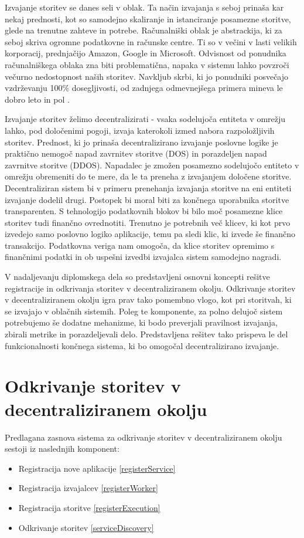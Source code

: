 \documentclass[a4paper, 12pt]{book}
\begin{document}
Izvajanje storitev se danes seli v oblak.
Ta način izvajanja s seboj prinaša kar nekaj prednosti, kot so samodejno skaliranje in istanciranje posamezne storitve, glede na trenutne zahteve in potrebe.
Računalniški oblak je abstrackija, ki za seboj skriva ogromne podatkovne in računske centre.
Ti so v večini v lasti velikih korporacij, prednjačijo Amazon, Google in Microsoft.
Odvisnost od ponudnika računalniškega oblaka zna biti problematična, napaka v sistemu lahko povzroči večurno nedostopnost naših storitev. 
Navkljub skrbi, ki jo ponudniki posvečajo vzdrževanju 100\% dosegljivosti, od zadnjega odmevnejšega primera mineva le dobro leto in pol \cite{awsFail}.

Izvajanje storitev želimo decentralizirati - vsaka sodelujoča entiteta v omrežju lahko, pod določenimi pogoji, izvaja katerokoli izmed nabora razpoložljivih storitev.
Prednost, ki jo prinaša decentralizirano izvajanje poslovne logike je praktično nemogoč napad zavrnitev storitve (DOS) in porazdeljen napad zavrnitve storitve (DDOS).
Napadalec je zmožen posamezno sodelujočo entiteto v omrežju obremeniti do te mere, da le ta preneha z izvajanjem določene storitve.
Decentraliziran sistem bi v primeru prenehanja izvajanja storitve na eni entiteti izvajanje dodelil drugi. Postopek bi moral biti za končnega uporabnika storitve transparenten.
S tehnologijo podatkovnih blokov bi bilo moč posamezne klice storitev tudi finančno ovrednotiti.
Trenutno je potrebnih več klicev, ki kot prvo izvedejo samo poslovno logiko aplikacije, temu pa sledi klic, ki izvede še finančno transakcijo.
Podatkovna veriga nam omogoča, da klice storitev opremimo s finančnimi podatki in ob uspešni izvedbi izvajalca sistem samodejno nagradi.

V nadaljevanju diplomskega dela so predstavljeni osnovni koncepti rešitve registracije in odkrivanja storitev v decentraliziranem okolju.
Odkrivanje storitev v decentraliziranem okolju igra prav tako pomembno vlogo, kot pri storitvah, ki se izvajajo v oblačnih sistemih.
Poleg te komponente, za polno delujoč sistem potrebujemo še dodatne mehanizme, ki bodo preverjali pravilnost izvajanja, zbirali metrike in porazdeljevali delo.
Predstavljena rešitev tako prispeva le del funkcionalnosti končnega sistema, ki bo omogočal decentralizirano izvajanje.

\section{Odkrivanje storitev v decentraliziranem okolju}
Predlagana zasnova sistema za odkrivanje storitev v decentraliziranem okolju sestoji iz naslednjih komponent:
\begin{itemize}
	\item Registracija nove aplikacije \ref{registerService}
	\item Registracija izvajalcev \ref{registerWorker}
	\item Registracija storitve \ref{registerExecution}
	\item Odkrivanje storitev \ref{serviceDiscovery}
\end{itemize}
\end{document}
